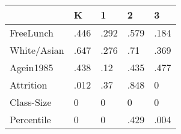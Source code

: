 \begin{table}[htbp]
\begin{tabular}{lllll} \hline \hline
 & K  & 1  & 2  & 3  \\  \hline 
FreeLunch & .446 & .292 & .579 & .184 \\  
White/Asian & .647 & .276 & .71 & .369 \\  
Agein1985 & .438 & .12 & .435 & .477 \\  
Attrition & .012 & .37 & .848 & 0 \\  
Class-Size & 0 & 0 & 0 & 0 \\  
Percentile & 0 & 0 & .429 & .004 \\  
\hline \hline \end{tabular}
\end{table}
